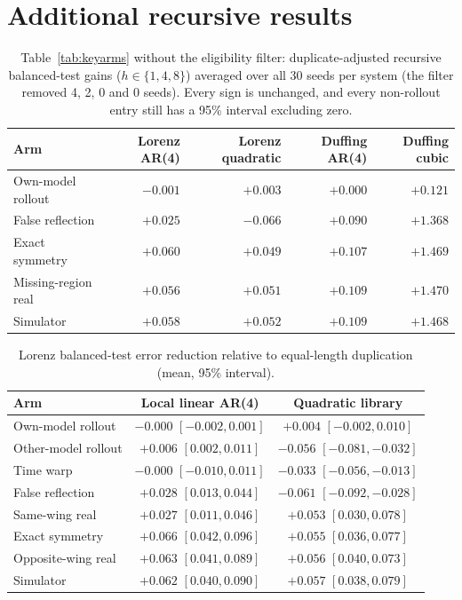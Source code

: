 \section{Additional recursive results}\label{app:results}
\begin{table}[H]
\centering\small
\caption{Table~\ref{tab:keyarms} without the eligibility filter: duplicate-adjusted recursive balanced-test gains ($h\in\{1,4,8\}$) averaged over all 30 seeds per system (the filter removed 4, 2, 0 and 0 seeds). Every sign is unchanged, and every non-rollout entry still has a 95\% interval excluding zero.}
\label{tab:allseed}
\setlength{\tabcolsep}{4.2pt}
\begin{tabular}{lrrrr}
\toprule
Arm & Lorenz AR(4) & Lorenz quadratic & Duffing AR(4) & Duffing cubic\\
\midrule
Own-model rollout & $-0.001$ & $+0.003$ & $+0.000$ & $+0.121$\\
False reflection & $+0.025$ & $-0.066$ & $+0.090$ & $+1.368$\\
Exact symmetry & $+0.060$ & $+0.049$ & $+0.107$ & $+1.469$\\
Missing-region real & $+0.056$ & $+0.051$ & $+0.109$ & $+1.470$\\
Simulator & $+0.058$ & $+0.052$ & $+0.109$ & $+1.468$\\
\bottomrule
\end{tabular}
\end{table}
\begin{table}[H]
\centering\small
\caption{Lorenz balanced-test error reduction relative to equal-length duplication (mean, 95\% interval).}
\begin{tabular}{lcc}
\toprule
Arm & Local linear AR(4) & Quadratic library\\
\midrule
Own-model rollout & $-0.000$ $[-0.002,0.001]$ & $+0.004$ $[-0.002,0.010]$\\
Other-model rollout & $+0.006$ $[0.002,0.011]$ & $-0.056$ $[-0.081,-0.032]$\\
Time warp & $-0.000$ $[-0.010,0.011]$ & $-0.033$ $[-0.056,-0.013]$\\
False reflection & $+0.028$ $[0.013,0.044]$ & $-0.061$ $[-0.092,-0.028]$\\
Same-wing real & $+0.027$ $[0.011,0.046]$ & $+0.053$ $[0.030,0.078]$\\
Exact symmetry & $+0.066$ $[0.042,0.096]$ & $+0.055$ $[0.036,0.077]$\\
Opposite-wing real & $+0.063$ $[0.041,0.089]$ & $+0.056$ $[0.040,0.073]$\\
Simulator & $+0.062$ $[0.040,0.090]$ & $+0.057$ $[0.038,0.079]$\\
\bottomrule
\end{tabular}
\end{table}

